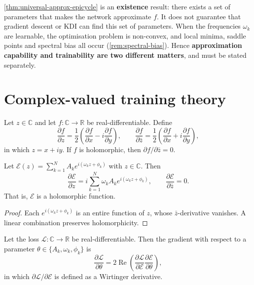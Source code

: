 \begin{remark}\label{rem:approx-vs-optimisation}
\cref{thm:universal-approx-epicycle} is an \textbf{existence} result: there exists a set of parameters that makes the network approximate $f$. It does not guarantee that gradient descent or KDI can find this set of parameters. When the frequencies $\omega_k$ are learnable, the optimisation problem is non-convex, and local minima, saddle points and spectral bias all occur (\cref{rem:spectral-bias}). Hence \textbf{approximation capability and trainability are two different matters}, and must be stated separately.
\end{remark}

\section{Complex-valued training theory}

\begin{definition}\label{def:wirtinger}
Let $z\in\mathbb C$ and let $f:\mathbb C\to\mathbb R$ be real-differentiable. Define
\[
\frac{\partial f}{\partial z}=\frac{1}{2}\left(\frac{\partial f}{\partial x}-i\frac{\partial f}{\partial y}\right),\qquad
\frac{\partial f}{\partial\bar z}=\frac{1}{2}\left(\frac{\partial f}{\partial x}+i\frac{\partial f}{\partial y}\right),
\]
in which $z=x+iy$. If $f$ is holomorphic, then $\partial f/\partial\bar z=0$.
\end{definition}

\begin{theorem}\label{thm:wirtinger-epicycle}
Let $\mathcal E(z)=\sum_{k=1}^{N}A_k e^{i(\omega_k z+\phi_k)}$ with $z\in\mathbb C$. Then
\[
\frac{\partial\mathcal E}{\partial z}=i\sum_{k=1}^{N}\omega_k A_k e^{i(\omega_k z+\phi_k)},\qquad
\frac{\partial\mathcal E}{\partial\bar z}=0.
\]
That is, $\mathcal E$ is a holomorphic function.
\end{theorem}

\begin{proof}
Each $e^{i(\omega_k z+\phi_k)}$ is an entire function of $z$, whose $\bar z$-derivative vanishes. A linear combination preserves holomorphicity.
\end{proof}

\begin{corollary}\label{cor:backprop-real-loss}
Let the loss $\mathcal L:\mathbb C\to\mathbb R$ be real-differentiable. Then the gradient with respect to a parameter $\theta\in\{A_k,\omega_k,\phi_k\}$ is
\[
\frac{\partial\mathcal L}{\partial\theta}=2\operatorname{Re}\left(\frac{\partial\mathcal L}{\partial\mathcal E}\frac{\partial\mathcal E}{\partial\theta}\right),
\]
in which $\partial\mathcal L/\partial\mathcal E$ is defined as a Wirtinger derivative.
\end{corollary}

